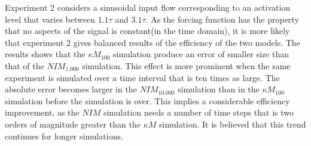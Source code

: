 		Experiment 2 considers a sinusoidal input flow corresponding to an activation level that varies between $1.1\tau$ and $3.1\tau$.
		As the forcing function has the property that no aspects of the signal is constant(in the time domain), %
			it is more likely that experiment 2 gives balanced results of the efficiency of the two models.
		The results shows that the $\kappa M_{100}$ simulation produce an error of smaller size than that of the $NIM_{1.000}$ simulation. %
		This effect is more prominent when the same experiment is simulated over a time interval that is ten times as large.
		The absolute error becomes larger in the $NIM_{10.000}$ simulation than in the $\kappa M_{100}$ simulation before the simulation is over.
		This implies a considerable efficiency improvement, as the $NIM$ simulation needs a number of time steps that is two orders of magnitude greater than the $\kappa M$ simulation.
		It is believed that this trend continues for longer simulations. 

